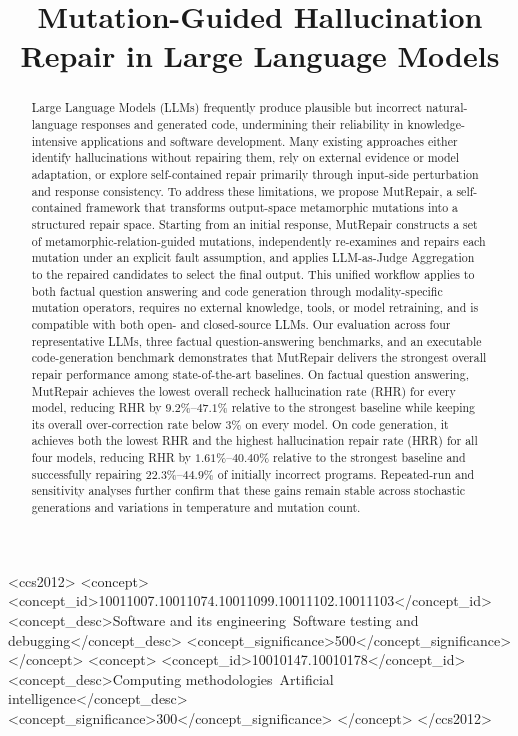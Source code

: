 \documentclass[acmsmall,screen,review,anonymous]{acmart}
\title{Mutation-Guided Hallucination Repair in Large Language Models}
\begin{document}
\begin{abstract}

Large Language Models (LLMs) frequently produce plausible but incorrect natural-language responses and generated code, undermining their reliability in knowledge-intensive applications and software development. Many existing approaches either identify hallucinations without repairing them, rely on external evidence or model adaptation, or explore self-contained repair primarily through input-side perturbation and response consistency.
To address these limitations, we propose MutRepair, a self-contained framework that transforms output-space metamorphic mutations into a structured repair space.
Starting from an initial response, MutRepair constructs a set of metamorphic-relation-guided mutations, independently re-examines and repairs each mutation under an explicit fault assumption, and applies LLM-as-Judge Aggregation to the repaired candidates to select the final output. This unified workflow applies to both factual question answering and code generation through modality-specific mutation operators, requires no external knowledge, tools, or model retraining, and is compatible with both open- and closed-source LLMs.
Our evaluation across four representative LLMs, three factual question-answering benchmarks, and an executable code-generation benchmark demonstrates that MutRepair delivers the strongest overall repair performance among state-of-the-art baselines. On factual question answering, MutRepair achieves the lowest overall recheck hallucination rate (RHR) for every model, reducing RHR by $9.2\%\text{--}47.1\%$ relative to the strongest baseline while keeping its overall over-correction rate below $3\%$ on every model. On code generation, it achieves both the lowest RHR and the highest hallucination repair rate (HRR) for all four models, reducing RHR by $1.61\%\text{--}40.40\%$ relative to the strongest baseline and successfully repairing $22.3\%\text{--}44.9\%$ of initially incorrect programs. Repeated-run and sensitivity analyses further confirm that these gains remain stable across stochastic generations and variations in temperature and mutation count.
    
\end{abstract}

\begin{CCSXML}
<ccs2012>
<concept>
<concept_id>10011007.10011074.10011099.10011102.10011103</concept_id>
<concept_desc>Software and its engineering~Software testing and debugging</concept_desc>
<concept_significance>500</concept_significance>
</concept>
<concept>
<concept_id>10010147.10010178</concept_id>
<concept_desc>Computing methodologies~Artificial intelligence</concept_desc>
<concept_significance>300</concept_significance>
</concept>
</ccs2012>
\end{CCSXML}
\end{document}
